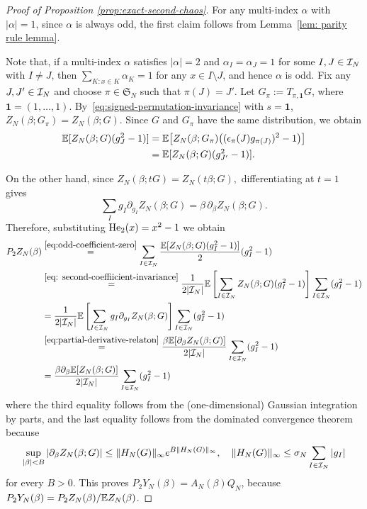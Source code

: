 \documentclass[../CLT_SYK.tex]{subfiles}
\begin{document}
\begin{proof}[{Proof { of Proposition \ref{prop:exact-second-chaos}}}]
For {any} multi-index $\alpha$ with $|\alpha|=1$, since $\alpha$ is always odd, the first claim follows from Lemma~\ref{lem: parity rule lemma}. 

{Note that, if a multi-index $\alpha$ satisfies $|\alpha|=2$ and $\alpha_I=\alpha_J=1$ for some $I,J\in\mathcal I_N$ with $I\ne J$, then $\sum_{K: x\in K} \alpha_K=1$ for any $x\in I\setminus J$, and hence $\alpha$ is odd.
Fix any $J,J'\in\mathcal I_N$ and choose $\pi\in\mathfrak S_N$
such that $\pi(J)=J'$.
Let $G_\pi:=T_{\pi,\mathbf 1}G$, where $\mathbf 1=(1,\ldots,1)$.
By~\eqref{eq:signed-permutation-invariance} with $s=\mathbf 1$,
$Z_N(\beta;G_\pi)=Z_N(\beta;G)$.
Since $G$ and $G_\pi$ have the same distribution, we obtain
\begin{align}\label{eq: second-coeffiicient-invariance}
  \mathbb E[Z_N(\beta;G)(g_J^2-1)]
  &=\mathbb E\!\left[Z_N(\beta;G_\pi)
    \bigl((\epsilon_\pi(J)g_{\pi(J)})^2-1\bigr)\right]\notag\\
  &=\mathbb E[Z_N(\beta;G)(g_{J'}^2-1)].
\end{align}}

On the other hand,  since $
  Z_N(\beta;tG)
  =Z_N(t\beta;G),
$ 
 differentiating at $t=1$ gives
 \begin{equation}\label{eq:partial-derivative-relaton}
 \sum_Ig_I\partial_{g_I}Z_N(\beta;G)
=\beta\,\partial_\beta Z_N(\beta;G).
 \end{equation}
{Therefore, substituting ${\rm He}_2(x)=x^2-1$ we obtain
\begin{align*}
	P_2Z_N(\beta)&\overset{\eqref{eq:odd-coefficient-zero}}{=}\sum_{I\in\mathcal I_N}\frac{\mathbb E[Z_N(\beta;G)(g_I^2-1)]}{2}(g_I^2-1)\\
	&\overset{\eqref{eq: second-coeffiicient-invariance}}{=}\frac{1}{2|\mathcal I_N|}\mathbb E\left[\sum_{I\in\mathcal I_N}Z_N(\beta;G)(g_I^2-1)\right]\sum_{I\in\mathcal I_N}(g_I^2-1)\\
	&=\frac{1}{2|\mathcal I_N|}\mathbb E\left[\sum_{I\in\mathcal I_N}g_I\partial_{g_I}Z_N(\beta;G)\right]\sum_{I\in\mathcal I_N}(g_I^2-1)\\
	&\overset{\eqref{eq:partial-derivative-relaton}}{=}\frac{\beta\mathbb E[\partial_\beta Z_N(\beta;G)]}{2|\mathcal I_N|}\sum_{I\in\mathcal I_N}(g_I^2-1)\\
	&=\frac{\beta\partial_\beta\mathbb E[ Z_N(\beta;G)]}{2|\mathcal I_N|}\sum_{I\in\mathcal I_N}(g_I^2-1)
\end{align*}
where the third equality follows from the (one-dimensional) Gaussian integration by parts, and the last equality follows from the dominated convergence theorem because
\[\sup_{|\beta|<B}|\partial_\beta Z_N(\beta;G)|\le \|H_N(G)\|_\infty e^{B\|H_N(G)\|_\infty},\quad  \|H_N(G)\|_\infty\le \sigma_N\sum_{I\in\mathcal I_N}|g_I|\]
for every $B>0$.} 
This proves {$P_2 Y_N(\beta)
	=A_N(\beta)Q_N$, because $P_2Y_N(\beta)=P_2Z_N(\beta)/\mathbb E Z_N(\beta)$}.
\end{proof}
\end{document}
